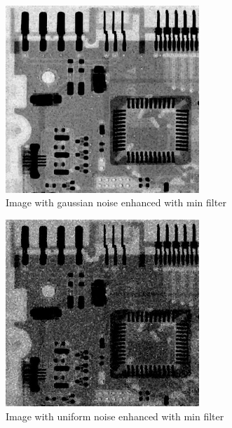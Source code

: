 \documentclass[10pt]{article}
\begin{document}
\begin{figure}[!ht]
	\centering
	\includegraphics[height=200pt]{./ex4/gaussmin.jpg}
	\caption{Image with gaussian noise enhanced with min filter}
\end{figure}
\begin{figure}[!ht]
	\centering
	\includegraphics[height=200pt]{./ex4/unimin.jpg}
	\caption{Image with uniform noise enhanced with min filter}
\end{figure}
\end{document}
